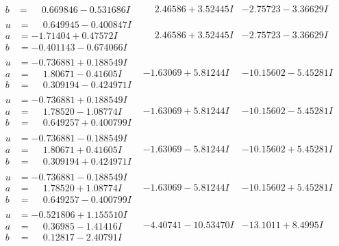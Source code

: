 \documentclass[1p]{elsarticle_modified}
\theoremstyle{definition}
\begin{document}
$$\begin{array}{c|c|c}
\begin{aligned}
b &= \phantom{-}0.669846 - 0.531686 I\end{aligned}
 & \phantom{-}2.46586 + 3.52445 I & -2.75723 - 3.36629 I \\ \hline\begin{aligned}
u &= \phantom{-}0.649945 - 0.400847 I \\
a &= -1.71404 + 0.47572 I \\
b &= -0.401143 - 0.674066 I\end{aligned}
 & \phantom{-}2.46586 + 3.52445 I & -2.75723 - 3.36629 I \\ \hline\begin{aligned}
u &= -0.736881 + 0.188549 I \\
a &= \phantom{-}1.80671 - 0.41605 I \\
b &= \phantom{-}0.309194 - 0.424971 I\end{aligned}
 & -1.63069 + 5.81244 I & -10.15602 - 5.45281 I \\ \hline\begin{aligned}
u &= -0.736881 + 0.188549 I \\
a &= \phantom{-}1.78520 - 1.08774 I \\
b &= \phantom{-}0.649257 + 0.400799 I\end{aligned}
 & -1.63069 + 5.81244 I & -10.15602 - 5.45281 I \\ \hline\begin{aligned}
u &= -0.736881 - 0.188549 I \\
a &= \phantom{-}1.80671 + 0.41605 I \\
b &= \phantom{-}0.309194 + 0.424971 I\end{aligned}
 & -1.63069 - 5.81244 I & -10.15602 + 5.45281 I \\ \hline\begin{aligned}
u &= -0.736881 - 0.188549 I \\
a &= \phantom{-}1.78520 + 1.08774 I \\
b &= \phantom{-}0.649257 - 0.400799 I\end{aligned}
 & -1.63069 - 5.81244 I & -10.15602 + 5.45281 I \\ \hline\begin{aligned}
u &= -0.521806 + 1.155510 I \\
a &= \phantom{-}0.36985 - 1.41416 I \\
b &= \phantom{-}0.12817 - 2.40791 I\end{aligned}
 & -4.40741 - 10.53470 I & -13.1011 + 8.4995 I \\ \hline\begin{aligned}

\end{aligned}
\end{array}$$
\end{document}
